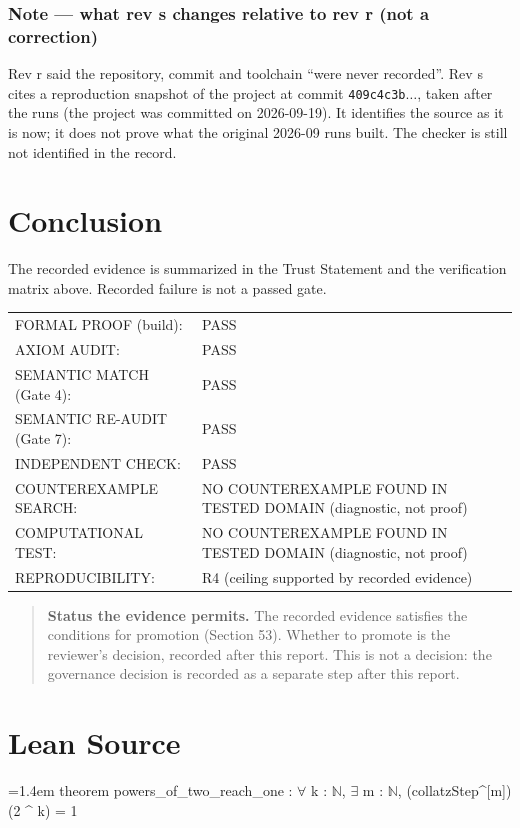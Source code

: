\documentclass[11pt]{article}
\begin{document}
\subsubsection*{Note --- what rev s changes relative to rev r (not a correction)}
Rev r said the repository, commit and toolchain ``were never recorded''. Rev s cites a reproduction snapshot of the project at commit \texttt{409c4c3b\ensuremath{\ldots}}, taken after the runs (the project was committed on 2026-09-19). It identifies the source as it is now; it does not prove what the original 2026-09 runs built. The checker is still not identified in the record.



\section{Conclusion}
The recorded evidence is summarized in the Trust Statement and the verification matrix above. Recorded failure is not a passed gate.
\begin{center}\begin{tabular}{@{}p{}p{}@{}}
FORMAL PROOF (build): & PASS \\
AXIOM AUDIT: & PASS \\
SEMANTIC MATCH (Gate 4): & PASS \\
SEMANTIC RE-AUDIT (Gate 7): & PASS \\
INDEPENDENT CHECK: & PASS \\
COUNTEREXAMPLE SEARCH: & NO COUNTEREXAMPLE FOUND IN TESTED DOMAIN (diagnostic, not proof) \\
COMPUTATIONAL TEST: & NO COUNTEREXAMPLE FOUND IN TESTED DOMAIN (diagnostic, not proof) \\
REPRODUCIBILITY: & R4 (ceiling supported by recorded evidence) \\
\end{tabular}\end{center}
\begin{quote}\textbf{Status the evidence permits.} The recorded evidence satisfies the conditions for promotion (Section 53). Whether to promote is the reviewer's decision, recorded after this report. This is not a decision: the governance decision is recorded as a separate step after this report.\end{quote}
\appendix
\section{Lean Source}
{\footnotesize\ttfamily\raggedright\hangindent=1.4em\noindent
\hspace*{0.00em}theorem powers\_\allowbreak{}of\_\allowbreak{}two\_\allowbreak{}reach\_\allowbreak{}one : \ensuremath{\forall} k : \ensuremath{\mathbb{N}}, \ensuremath{\exists} m : \ensuremath{\mathbb{N}}, (collatzStep\textasciicircum{}[m]) (2 \textasciicircum{} k) = 1\par
}
\end{document}
